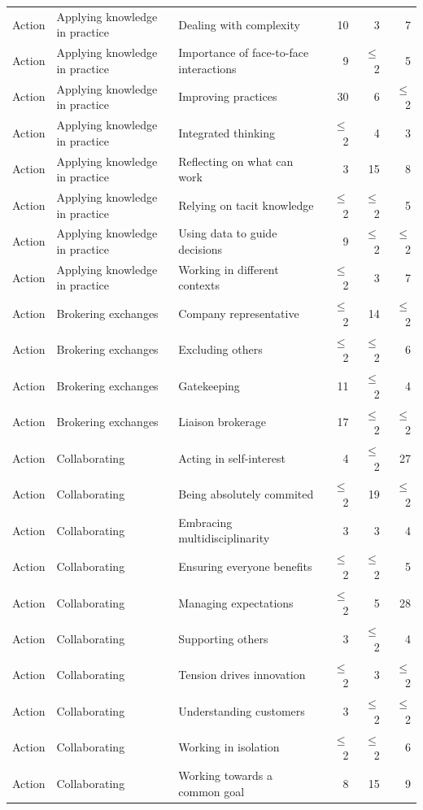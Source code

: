 \begin{landscape}
\begin{longtable}[c]{lllrrr}
\midrule
Action & Applying knowledge in practice & Dealing with complexity & 10 & 3 & 7 \\ 
Action & Applying knowledge in practice & Importance of face-to-face interactions & 9 & $\leq$ 2 & 5 \\ 
Action & Applying knowledge in practice & Improving practices & 30 & 6 & $\leq$ 2 \\ 
Action & Applying knowledge in practice & Integrated thinking & $\leq$ 2 & 4 & 3 \\ 
Action & Applying knowledge in practice & Reflecting on what can work & 3 & 15 & 8 \\ 
Action & Applying knowledge in practice & Relying on tacit knowledge & $\leq$ 2 & $\leq$ 2 & 5 \\ 
Action & Applying knowledge in practice & Using data to guide decisions & 9 & $\leq$ 2 & $\leq$ 2 \\ 
Action & Applying knowledge in practice & Working in different contexts & $\leq$ 2 & 3 & 7 \\ 
Action & Brokering exchanges & Company representative & $\leq$ 2 & 14 & $\leq$ 2 \\ 
Action & Brokering exchanges & Excluding others & $\leq$ 2 & $\leq$ 2 & 6 \\ 
Action & Brokering exchanges & Gatekeeping & 11 & $\leq$ 2 & 4 \\ 
Action & Brokering exchanges & Liaison brokerage & 17 & $\leq$ 2 & $\leq$ 2 \\ 
Action & Collaborating & Acting in self-interest & 4 & $\leq$ 2 & 27 \\ 
Action & Collaborating & Being absolutely commited & $\leq$ 2 & 19 & $\leq$ 2 \\ 
Action & Collaborating & Embracing multidisciplinarity & 3 & 3 & 4 \\ 
Action & Collaborating & Ensuring everyone benefits & $\leq$ 2 & $\leq$ 2 & 5 \\ 
Action & Collaborating & Managing expectations & $\leq$ 2 & 5 & 28 \\ 
Action & Collaborating & Supporting others & 3 & $\leq$ 2 & 4 \\ 
Action & Collaborating & Tension drives innovation & $\leq$ 2 & 3 & $\leq$ 2 \\ 
Action & Collaborating & Understanding customers & 3 & $\leq$ 2 & $\leq$ 2 \\ 
Action & Collaborating & Working in isolation & $\leq$ 2 & $\leq$ 2 & 6 \\ 
Action & Collaborating & Working towards a common goal & 8 & 15 & 9 \\ 

\end{longtable}
\end{landscape}
